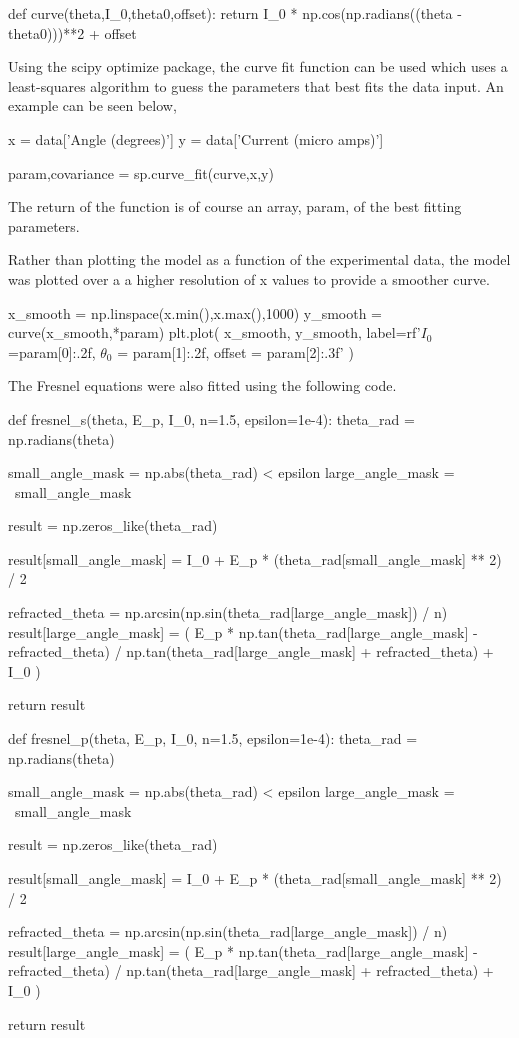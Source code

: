 \documentclass{article}
\begin{document}
\begin{python}
def curve(theta,I_0,theta0,offset):
    return I_0 * np.cos(np.radians((theta - theta0)))**2 + offset
\end{python}

Using the scipy optimize package, the curve fit function can be 
used which uses a least-squares algorithm to guess the parameters 
that best fits the data input. An example can be seen below,

\begin{python}
x = data['Angle (degrees)']
y = data['Current (micro amps)']

param,covariance = sp.curve_fit(curve,x,y)
\end{python}

The return of the function is of course an array, param, of the best 
fitting parameters.

Rather than plotting the model as a function of the experimental data,
the model was plotted over a a higher resolution of x values to provide 
a smoother curve.

\begin{python}
x_smooth = np.linspace(x.min(),x.max(),1000)
y_smooth = curve(x_smooth,*param)
plt.plot(
    x_smooth,
    y_smooth,
    label=rf'$I_0$={param[0]:.2f}, $\theta_0$ = {param[1]:.2f}, offset = {param[2]:.3f}'
)
\end{python}

The Fresnel equations were also fitted using the following code.

\begin{python}
def fresnel_s(theta, E_p, I_0, n=1.5, epsilon=1e-4):
    theta_rad = np.radians(theta)
    
    small_angle_mask = np.abs(theta_rad) < epsilon
    large_angle_mask = ~small_angle_mask
    
    result = np.zeros_like(theta_rad)
    
    result[small_angle_mask] = I_0 + E_p * (theta_rad[small_angle_mask] ** 2) / 2
    
    refracted_theta = np.arcsin(np.sin(theta_rad[large_angle_mask]) / n)
    result[large_angle_mask] = (
        E_p * np.tan(theta_rad[large_angle_mask] - refracted_theta) / 
        np.tan(theta_rad[large_angle_mask] + refracted_theta) + I_0
    )
    
    return result

def fresnel_p(theta, E_p, I_0, n=1.5, epsilon=1e-4):
    theta_rad = np.radians(theta)
    
    small_angle_mask = np.abs(theta_rad) < epsilon
    large_angle_mask = ~small_angle_mask
    
    result = np.zeros_like(theta_rad)
    
    result[small_angle_mask] = I_0 + E_p * (theta_rad[small_angle_mask] ** 2) / 2
    
    refracted_theta = np.arcsin(np.sin(theta_rad[large_angle_mask]) / n)
    result[large_angle_mask] = (
        E_p * np.tan(theta_rad[large_angle_mask] - refracted_theta) / 
        np.tan(theta_rad[large_angle_mask] + refracted_theta) + I_0
    )
    
    return result
\end{python}
\end{document}
